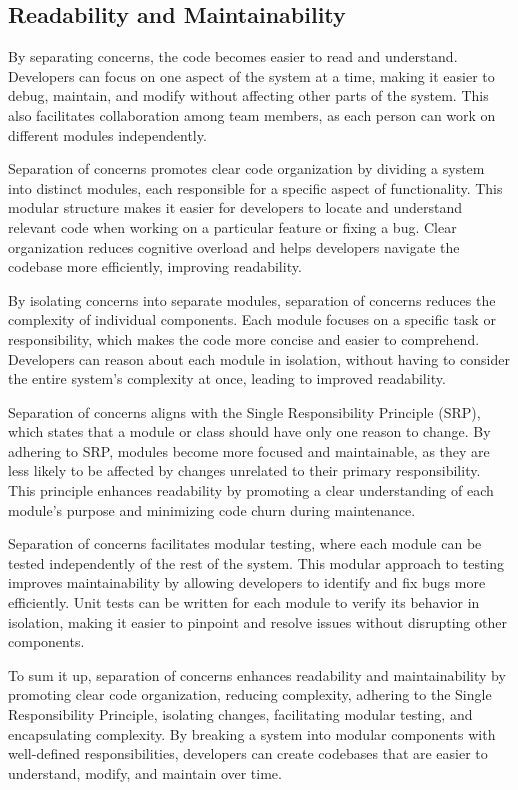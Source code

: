 \subsection{Readability and Maintainability}
By separating concerns, the code becomes easier to read and understand.
Developers can focus on one aspect of the system at a time, making it easier to debug, maintain, and modify without affecting other parts of the system.
This also facilitates collaboration among team members, as each person can work on different modules independently.
\par
Separation of concerns promotes clear code organization by dividing a system into distinct modules, each responsible for a specific aspect of functionality.
This modular structure makes it easier for developers to locate and understand relevant code when working on a particular feature or fixing a bug.
Clear organization reduces cognitive overload and helps developers navigate the codebase more efficiently, improving readability.
\par
By isolating concerns into separate modules, separation of concerns reduces the complexity of individual components.
Each module focuses on a specific task or responsibility, which makes the code more concise and easier to comprehend.
Developers can reason about each module in isolation, without having to consider the entire system's complexity at once, leading to improved readability.
\par
Separation of concerns aligns with the Single Responsibility Principle (SRP), which states that a module or class should have only one reason to change.
By adhering to SRP, modules become more focused and maintainable, as they are less likely to be affected by changes unrelated to their primary responsibility.
This principle enhances readability by promoting a clear understanding of each module's purpose and minimizing code churn during maintenance.
\par
Separation of concerns facilitates modular testing, where each module can be tested independently of the rest of the system.
This modular approach to testing improves maintainability by allowing developers to identify and fix bugs more efficiently.
Unit tests can be written for each module to verify its behavior in isolation, making it easier to pinpoint and resolve issues without disrupting other components.
\par
To sum it up, separation of concerns enhances readability and maintainability by promoting clear code organization, reducing complexity, adhering to the Single Responsibility Principle, isolating changes, facilitating modular testing, and encapsulating complexity.
By breaking a system into modular components with well-defined responsibilities, developers can create codebases that are easier to understand, modify, and maintain over time.


